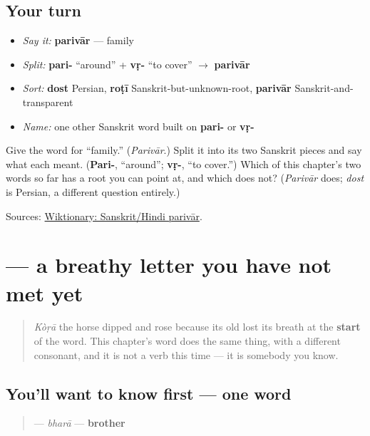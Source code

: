 \subsection*{Your turn}
\begin{itemize}
\raggedright
  \item \emph{Say it:} \textbf{parivār} — family
  \item \emph{Split:} \textbf{pari-} \textquotedblleft{}around\textquotedblright{} + \textbf{vṛ-} \textquotedblleft{}to cover\textquotedblright{} $\to$ \textbf{parivār}
  \item \emph{Sort:} \textbf{dost} Persian, \textbf{roṭī} Sanskrit-but-unknown-root, \textbf{parivār} Sanskrit-and-transparent
  \item \emph{Name:} one other Sanskrit word built on \textbf{pari-} or \textbf{vṛ-}
\end{itemize}

\begin{tcolorbox}[breakable,colback=teal!4,colframe=teal!35!black,title={Before you move on}]
Give the word for \textquotedblleft{}family.\textquotedblright{} (\emph{Parivār}.) Split it into its two Sanskrit pieces and say what each meant. (\textbf{Pari-}, \textquotedblleft{}around\textquotedblright{}; \textbf{vṛ-}, \textquotedblleft{}to cover.\textquotedblright{}) Which of this chapter's two words so far has a root you can point at, and which does not? (\emph{Parivār} does; \emph{dost} is Persian, a different question entirely.)

Sources: \href{https://en.wiktionary.org/wiki/\%E0\%A4\%AA\%E0\%A4\%B0\%E0\%A4\%BF\%E0\%A4\%B5\%E0\%A4\%BE\%E0\%A4\%B0}{Wiktionary: Sanskrit/Hindi parivār}.
\end{tcolorbox}
\section[\texorpdfstring{\pa{ਭਰਾ} (bharā)}{ਭਰਾ (bharā)}]{ — a breathy letter you have not met yet}

\label{lesson:PA-C11-bhara}



\begin{quote}
\emph{Kòṛā} the horse dipped and rose because its old \textbf{} lost its breath at the \textbf{start} of the word. This chapter's word does the same thing, with a different consonant, and it is not a verb this time — it is somebody you know.
\end{quote}

\subsection*{You'll want to know first — one word}
\begin{quote}
\textbf{} — \emph{bharā} — \textbf{brother}
\end{quote}

